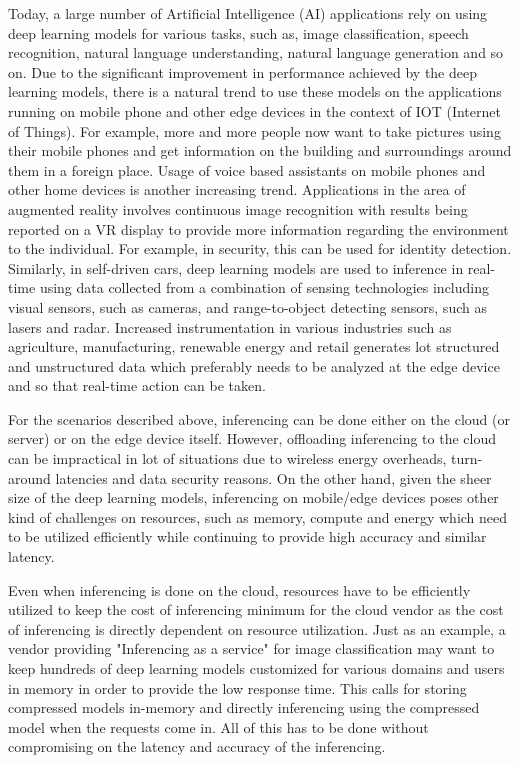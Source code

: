 Today, a large number of Artificial Intelligence (AI) applications rely on using deep learning models for various tasks, such as, image classification, speech recognition, natural language understanding, natural language generation and so on.
Due to the significant improvement in performance achieved by the deep learning models, there is a natural trend to use these models on the applications running on mobile phone and other edge devices in the context of IOT (Internet of Things). 
For example, more and more people now want to take pictures using their mobile phones and get information on the building and surroundings around them in a foreign place. Usage of voice based assistants on mobile phones and other home devices is another increasing trend. 
Applications in the area of augmented reality involves continuous image recognition with results being reported on a VR display to provide more information regarding the environment to the individual. 
For example, in security, this can be used for identity detection.
Similarly, in self-driven cars, deep learning models are used
to inference in real-time using data collected from a combination of sensing technologies including visual sensors, such as cameras, and range-to-object detecting sensors, such as lasers and radar. 
Increased instrumentation in various industries such as agriculture, manufacturing, renewable energy and retail generates lot structured and unstructured data which preferably needs to be analyzed at the edge device and so that real-time action can be taken.

For the scenarios described above, inferencing can be done either on the cloud (or server) or on the edge device itself. However, offloading  inferencing to  the cloud can be impractical in lot of situations due to  wireless  energy  overheads, turn-around latencies and data security reasons. On the other hand, given the sheer size of the deep learning models, inferencing on mobile/edge devices poses other kind of challenges on resources, such as memory, compute and energy which need to be utilized efficiently while continuing to provide high accuracy and similar latency.


Even when inferencing is done on the cloud, resources have to be efficiently utilized to keep the cost of inferencing minimum for the cloud vendor as the cost of inferencing is directly dependent on resource utilization. Just as an example, a vendor providing "Inferencing as a service" for image classification may want to keep hundreds of deep learning models customized for various domains and users in memory in order to provide the low response time. This calls for storing compressed models in-memory and directly inferencing using the compressed model when the requests come in. All of this has to be done without compromising on the latency and accuracy of the inferencing.

